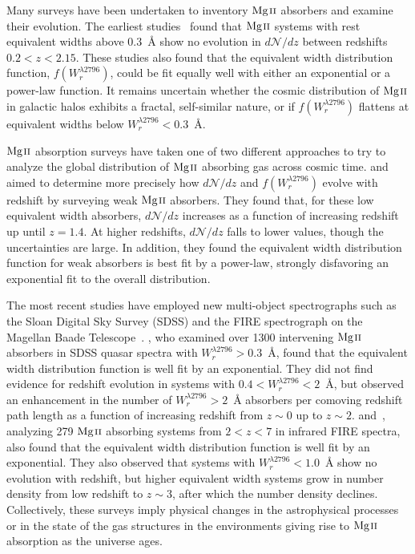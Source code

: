 Many surveys have been undertaken to inventory ${\hbox{{\rm Mg}\kern 0.1em{\sc ii}}}$ absorbers and examine their evolution. The earliest studies~\citep{Lanzetta1987,Tytler1987,Sargent1988,Steidel1992} found that ${\hbox{{\rm Mg}\kern 0.1em{\sc ii}}}$ systems with rest equivalent widths above $0.3$~{\AA} show no evolution in $d\mathcal{N}\!/dz$ between redshifts $0.2 < z < 2.15$. These studies also found that the equivalent width distribution function, $f(W_r^{\lambda2796})$, could be fit equally well with either an exponential or a power-law function. It remains uncertain whether the cosmic distribution of ${\hbox{{\rm Mg}\kern 0.1em{\sc ii}}}$ in galactic halos exhibits a fractal, self-similar nature, or if $f(W_r^{\lambda2796})$ flattens at equivalent widths below $W_r^{\lambda2796} < 0.3$~{\AA}.

${\hbox{{\rm Mg}\kern 0.1em{\sc ii}}}$ absorption surveys have taken one of two different approaches to try to analyze the global distribution of ${\hbox{{\rm Mg}\kern 0.1em{\sc ii}}}$ absorbing gas across cosmic time. \cite{Churchill1999} and \cite{Narayanan2007} aimed to determine more precisely how $d\mathcal{N}\!/dz$ and $f(W_r^{\lambda2796})$ evolve with redshift by surveying weak ${\hbox{{\rm Mg}\kern 0.1em{\sc ii}}}$ absorbers. They found that, for these low equivalent width absorbers, $d\mathcal{N}\!/dz$ increases as a function of increasing redshift up until $z = 1.4$. At higher redshifts, $d\mathcal{N}\!/dz$ falls to lower values, though the uncertainties are large. In addition, they found the equivalent width distribution function for weak absorbers is best fit by a power-law, strongly disfavoring an exponential fit to the overall distribution.

The most recent studies have employed new multi-object spectrographs such as the Sloan Digital Sky Survey (SDSS) and the FIRE spectrograph on the Magellan Baade Telescope~\citep{Nestor2005,Matejek2012,Chen2016}. \cite{Nestor2005}, who examined over 1300 intervening ${\hbox{{\rm Mg}\kern 0.1em{\sc ii}}}$ absorbers in SDSS quasar spectra with $W_r^{\lambda2796} > 0.3$~{\AA}, found that the equivalent width distribution function is well fit by an exponential. They did not find evidence for redshift evolution in systems with $0.4 < W_r^{\lambda2796} < 2$~{\AA}, but observed an enhancement in the number of $W_r^{\lambda2796} > 2$~{\AA} absorbers per comoving redshift path length as a function of increasing redshift from $z \sim 0$ up to $z \sim 2$. \cite{Matejek2012} and~\cite{Chen2016}, analyzing 279 ${\hbox{{\rm Mg}\kern 0.1em{\sc ii}}}$ absorbing systems from $2 < z < 7$ in infrared FIRE spectra, also found that the equivalent width distribution function is well fit by an exponential. They also observed that systems with $W_r^{\lambda2796} < 1.0$~{\AA} show no evolution with redshift, but higher equivalent width systems grow in number density from low redshift to $z \sim 3$, after which the number density declines. Collectively, these surveys imply physical changes in the astrophysical processes or in the state of the gas structures in the environments giving rise to ${\hbox{{\rm Mg}\kern 0.1em{\sc ii}}}$ absorption as the universe ages.


